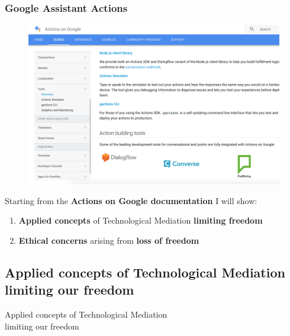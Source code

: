 \documentclass{beamer}
\begin{document}
\begin{frame}
\frametitle{Google Assistant Actions}
\vspace{-0.5cm}
\begin{figure}
	\centering
	\includegraphics[width=0.85\linewidth]{images/documentation_preview}
	\label{fig:documentationpreview}
\end{figure}

{\small Starting from the \textbf{Actions on Google documentation} I will show:
\begin{enumerate}
	\item \textbf{Applied concepts} of Technological Mediation \textbf{limiting freedom}
	\item \textbf{Ethical concerns} arising from \textbf{loss of freedom}
\end{enumerate}
}

\end{frame}

\subsection{Applied concepts of Technological Mediation limiting our freedom}
\begin{frame}
\begin{center} 
	 Applied concepts of Technological Mediation\\limiting our freedom
\end{center}
\end{frame}
\end{document}
